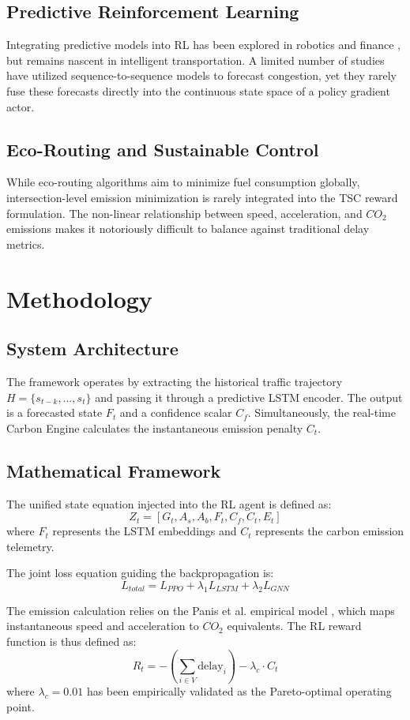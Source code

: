 \documentclass{ieeeaccess}
\begin{document}
\subsection{Predictive Reinforcement Learning}
Integrating predictive models into RL has been explored in robotics and finance \cite{placeholder6}, but remains nascent in intelligent transportation. A limited number of studies have utilized sequence-to-sequence models to forecast congestion, yet they rarely fuse these forecasts directly into the continuous state space of a policy gradient actor.

\subsection{Eco-Routing and Sustainable Control}
While eco-routing algorithms aim to minimize fuel consumption globally, intersection-level emission minimization is rarely integrated into the TSC reward formulation. The non-linear relationship between speed, acceleration, and $CO_2$ emissions makes it notoriously difficult to balance against traditional delay metrics.

\section{Methodology}
\label{sec:methodology}

\subsection{System Architecture}
The framework operates by extracting the historical traffic trajectory $H = \{s_{t-k}, \dots, s_t\}$ and passing it through a predictive LSTM encoder. The output is a forecasted state $F_t$ and a confidence scalar $C_f$. Simultaneously, the real-time Carbon Engine calculates the instantaneous emission penalty $C_t$. 

\subsection{Mathematical Framework}
The unified state equation injected into the RL agent is defined as:
$$Z_t = [G_t, A_s, A_b, F_t, C_f, C_t, E_t]$$
where $F_t$ represents the LSTM embeddings and $C_t$ represents the carbon emission telemetry.

The joint loss equation guiding the backpropagation is:
$$L_{total} = L_{PPO} + \lambda_1 L_{LSTM} + \lambda_2 L_{GNN}$$

The emission calculation relies on the Panis et al. empirical model \cite{placeholder7}, which maps instantaneous speed and acceleration to $CO_2$ equivalents. The RL reward function is thus defined as:
\begin{equation}
    R_t = - \left( \sum_{i \in V} \text{delay}_i \right) - \lambda_c \cdot C_t
\end{equation}
where $\lambda_c = 0.01$ has been empirically validated as the Pareto-optimal operating point.
\end{document}
